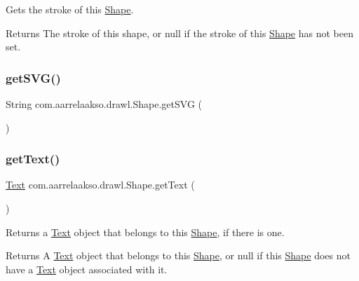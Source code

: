 Gets the stroke of this \hyperlink{classcom_1_1aarrelaakso_1_1drawl_1_1_shape}{Shape}. 

\begin{DoxyReturn}{Returns}
The stroke of this shape, or null if the stroke of this \hyperlink{classcom_1_1aarrelaakso_1_1drawl_1_1_shape}{Shape} has not been set. 
\end{DoxyReturn}
\mbox{\label{classcom_1_1aarrelaakso_1_1drawl_1_1_shape_aca74cc0c71117040f28329744eebde9d}} 
\subsubsection{\texorpdfstring{get\+S\+V\+G()}{getSVG()}}
{\footnotesize\ttfamily String com.\+aarrelaakso.\+drawl.\+Shape.\+get\+S\+VG (\begin{DoxyParamCaption}{ }\end{DoxyParamCaption})}

\mbox{\label{classcom_1_1aarrelaakso_1_1drawl_1_1_shape_a6f876978d4102974fedc5b41c93c7b26}} 
\subsubsection{\texorpdfstring{get\+Text()}{getText()}}
{\footnotesize\ttfamily \hyperlink{classcom_1_1aarrelaakso_1_1drawl_1_1_text}{Text} com.\+aarrelaakso.\+drawl.\+Shape.\+get\+Text (\begin{DoxyParamCaption}{ }\end{DoxyParamCaption})}



Returns a \hyperlink{classcom_1_1aarrelaakso_1_1drawl_1_1_text}{Text} object that belongs to this \hyperlink{classcom_1_1aarrelaakso_1_1drawl_1_1_shape}{Shape}, if there is one. 

\begin{DoxyReturn}{Returns}
A \hyperlink{classcom_1_1aarrelaakso_1_1drawl_1_1_text}{Text} object that belongs to this \hyperlink{classcom_1_1aarrelaakso_1_1drawl_1_1_shape}{Shape}, or {\ttfamily null} if this \hyperlink{classcom_1_1aarrelaakso_1_1drawl_1_1_shape}{Shape} does not have a \hyperlink{classcom_1_1aarrelaakso_1_1drawl_1_1_text}{Text} object associated with it. 
\end{DoxyReturn}
\mbox{\label{classcom_1_1aarrelaakso_1_1drawl_1_1_shape_aed4e9caa294aacc973b7a531a960e9e5}} 
